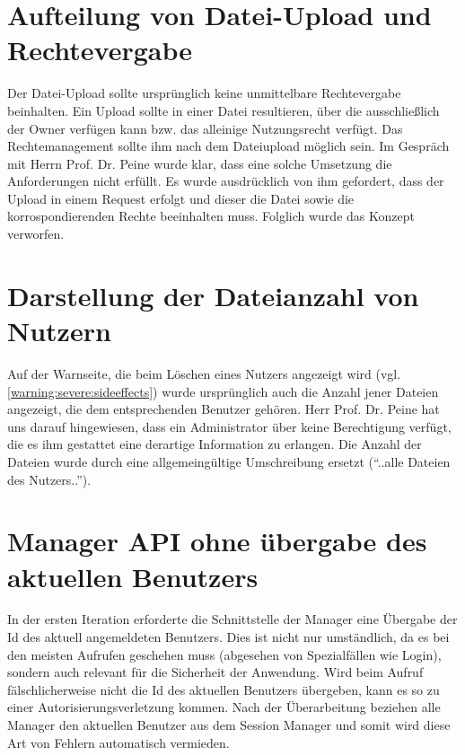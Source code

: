 \documentclass[12pt,DIV14,BCOR10mm,a4paper,parskip=half-,headsepline,headinclude,english,ngerman,bibliography=totocnumbered]{scrreprt}
\begin{document}
\section{Aufteilung von Datei-Upload und Rechtevergabe}
Der Datei-Upload sollte ursprünglich keine unmittelbare Rechtevergabe beinhalten. Ein Upload sollte in einer Datei resultieren, über die ausschließlich der Owner verfügen kann bzw. das alleinige Nutzungsrecht verfügt. Das Rechtemanagement sollte ihm nach dem Dateiupload möglich sein. Im Gespräch mit Herrn Prof. Dr. Peine wurde klar, dass eine solche Umsetzung die Anforderungen nicht erfüllt. Es wurde ausdrücklich von ihm gefordert, dass der Upload in einem Request erfolgt und dieser die Datei sowie die korrospondierenden Rechte beeinhalten muss. Folglich wurde das Konzept verworfen.

\section{Darstellung der Dateianzahl von Nutzern}
Auf der Warnseite, die beim Löschen eines Nutzers angezeigt wird (vgl. \ref{warning:severe:sideeffects}) wurde ursprünglich auch die Anzahl jener Dateien angezeigt, die dem entsprechenden Benutzer gehören. Herr Prof. Dr. Peine hat uns darauf hingewiesen, dass ein Administrator über keine Berechtigung verfügt, die es ihm gestattet eine derartige Information zu erlangen. Die Anzahl der Dateien wurde durch eine allgemeingültige Umschreibung ersetzt (\enquote{..alle Dateien des Nutzers..}).

\section{Manager API ohne übergabe des aktuellen Benutzers}
In der ersten Iteration erforderte die Schnittstelle der Manager eine Übergabe der Id des aktuell angemeldeten Benutzers. Dies ist nicht nur umständlich, da es bei den meisten Aufrufen geschehen muss (abgesehen von Spezialfällen wie Login), sondern auch relevant für die Sicherheit der Anwendung. Wird beim Aufruf fälschlicherweise nicht die Id des aktuellen Benutzers übergeben, kann es so zu einer Autorisierungsverletzung kommen. Nach der Überarbeitung beziehen alle Manager den aktuellen Benutzer aus dem Session Manager und somit wird diese Art von Fehlern automatisch vermieden.

\printbibliography

\printacronyms[title=Abkürzungsverzeichnis,toctitle=Abkürzungsverzeichnis]
\printglossary[title=Glossar,toctitle=Glossar,type=main]
\end{document}

